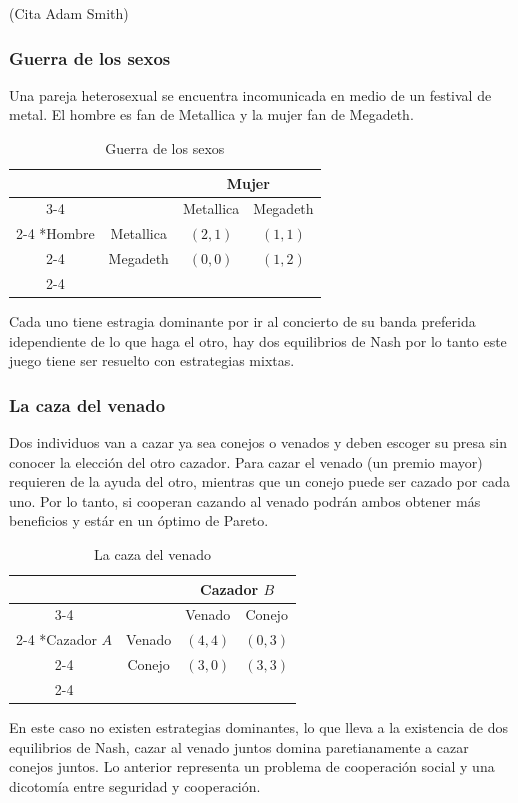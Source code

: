(Cita Adam Smith)

\subsubsection*{Guerra de los sexos}

Una pareja heterosexual se encuentra incomunicada en medio de un festival de metal. El hombre es fan de Metallica y la mujer fan de Megadeth. 

\begin{table}[!htbp]
    \centering
    \caption{Guerra de los sexos}
    \setlength{\extrarowheight}{2pt}
    \begin{tabular}{*{4}{c|}}
      \multicolumn{2}{c}{} & \multicolumn{2}{c}{Mujer}\\\cline{3-4}
      \multicolumn{1}{c}{} &  & Metallica  & Megadeth \\\cline{2-4}
      \multirow{2}*{Hombre}  & Metallica & $(2,1)$ & $(1,1)$ \\\cline{2-4}
      & Megadeth & $(0,0)$ & $(1,2)$ \\\cline{2-4}
    \end{tabular}
  \end{table}

  Cada uno tiene estragia dominante por ir al concierto de su banda preferida idependiente de lo que haga el otro, hay dos equilibrios de Nash por lo tanto este juego tiene ser resuelto con estrategias mixtas.

\subsubsection*{La caza del venado}
Dos individuos van a cazar ya sea conejos o venados y deben escoger su presa sin conocer la elección del otro cazador. Para cazar el venado (un premio mayor) requieren de la ayuda del otro, mientras que un conejo puede ser cazado por cada uno. Por lo tanto, si cooperan cazando al venado podrán ambos obtener más beneficios y estár en un óptimo de Pareto.

\begin{table}[!htbp]
    \centering
    \caption{La caza del venado}
    \setlength{\extrarowheight}{2pt}
    \begin{tabular}{*{4}{c|}}
      \multicolumn{2}{c}{} & \multicolumn{2}{c}{Cazador $B$}\\\cline{3-4}
      \multicolumn{1}{c}{} &  & Venado  & Conejo \\\cline{2-4}
      \multirow{2}*{Cazador $A$}  & Venado & $(4,4)$ & $(0,3)$ \\\cline{2-4}
      & Conejo & $(3,0)$ & $(3,3)$ \\\cline{2-4}
    \end{tabular}
  \end{table}
En este caso no existen estrategias dominantes, lo que lleva a la existencia de dos equilibrios de Nash, cazar al venado juntos domina paretianamente a cazar conejos juntos. Lo anterior representa un problema de cooperación social y una dicotomía entre seguridad y cooperación. 
